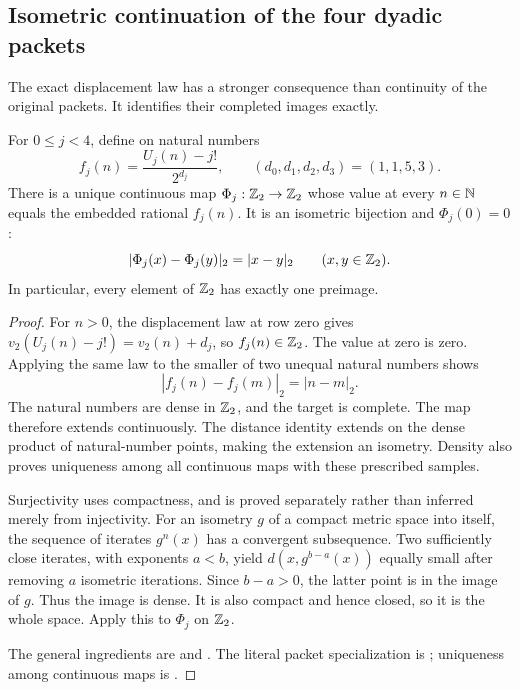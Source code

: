 \subsection{Isometric continuation of the four dyadic packets}

The exact displacement law has a stronger consequence than continuity of
the original packets.  It identifies their completed images exactly.

\begin{theorem}\label{thm:arith-isometry}
For $0\le j<4$, define on natural numbers
\[
 f_j(n)=\frac{U_j(n)-j!}{2^{d_j}},\qquad (d_0,d_1,d_2,d_3)=(1,1,5,3).
\]
There is a unique continuous map $\Phi_j:\mathbb Z_2\to\mathbb Z_2$ whose value at
every $n\in\mathbb N$ equals the embedded rational $f_j(n)$.
It is an isometric bijection and $\Phi_j(0)=0$:
\[
 |\Phi_j(x)-\Phi_j(y)|_2=|x-y|_2\qquad(x,y\in\mathbb Z_2).
\]
In particular, every element of $\mathbb Z_2$ has exactly one preimage.
\end{theorem}

\begin{proof}
For $n>0$, the displacement law at row zero gives
$v_2(U_j(n)-j!)=v_2(n)+d_j$, so $f_j(n)\in\mathbb Z_2$.
The value at zero is zero.  Applying the same law to the smaller of two
unequal natural numbers shows
\[
 |f_j(n)-f_j(m)|_2=|n-m|_2.
\]
The natural numbers are dense in $\mathbb Z_2$, and the target is complete.
The map therefore extends continuously.  The distance identity extends
on the dense product of natural-number points, making the extension
an isometry.  Density also proves uniqueness among all continuous maps
with these prescribed samples.

Surjectivity uses compactness, and is proved separately rather than
inferred merely from injectivity.  For an isometry $g$ of a compact
metric space into itself, the sequence of iterates $g^n(x)$ has a
convergent subsequence.  Two sufficiently close iterates, with exponents
$a<b$, yield $d(x,g^{b-a}(x))$ equally small after removing $a$ isometric
iterations.  Since $b-a>0$, the latter point is in the image of $g$.
Thus the image is dense.  It is also compact and hence closed, so it is
the whole space.  Apply this to $\Phi_j$ on $\mathbb Z_2$.

The general ingredients are
 and
.
The literal packet specialization is
;
uniqueness among continuous maps is
.
\end{proof}

